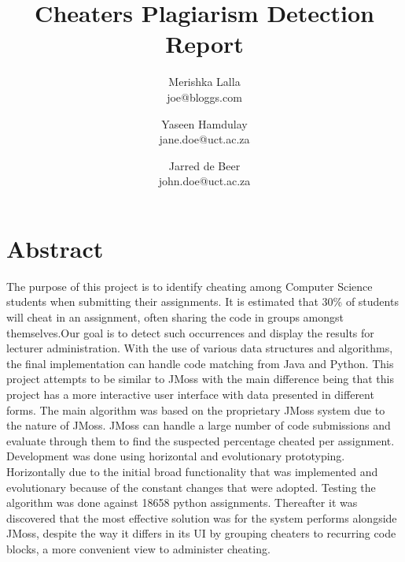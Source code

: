 \documentclass[11pt,a4paper]{article}
\begin{document}
\title{Cheaters Plagiarism Detection Report} \date{}
\author{Merishka Lalla\\joe@bloggs.com
\and Yaseen Hamdulay\\jane.doe@uct.ac.za
\and Jarred de Beer\\john.doe@uct.ac.za}

\chead{}
\lfoot{}
\cfoot{\thepage}    %
\rfoot{}
\renewcommand{\headrulewidth}{0.0pt}   %

\maketitle
\thispagestyle{plain}  %

\section*{Abstract}
The purpose of this project is to identify cheating among Computer Science students when submitting their assignments. It is estimated that 30\% of students will cheat in an assignment, often sharing the code in groups amongst themselves.Our goal is to detect such occurrences and display the results for lecturer administration. With the use of various data structures and algorithms, the final implementation can handle code matching from Java and Python. This project attempts to be similar to JMoss with the main difference being that this project has a more interactive user interface with data presented in different forms. The main algorithm was based on the proprietary JMoss system due to the nature of JMoss.  JMoss can handle a large number of code submissions and evaluate through them to find the suspected percentage cheated per assignment. Development was done using horizontal and evolutionary prototyping. Horizontally due to the initial broad functionality that was implemented and evolutionary because of the constant changes that were adopted. Testing the algorithm was done against 18658 python assignments. Thereafter it was discovered that the most effective solution was for the system performs alongside JMoss, despite the way it differs in its UI by grouping cheaters to recurring code blocks, a more convenient view to administer cheating.
\end{document}
